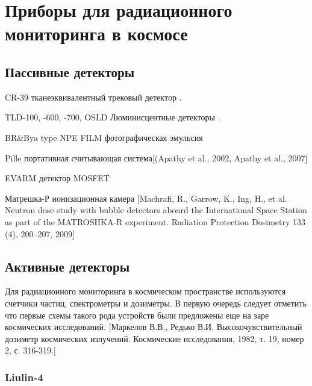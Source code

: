 \section{Приборы для радиационного мониторинга в космосе} \label{sect1_3}



\subsection{Пассивные детекторы} \label{subsect1_3_1}



CR-39 тканеэквивалентный трековый детектор \cite{Zhou2008}.


TLD-100, -600, -700, OSLD Люминисцентные детекторы \cite{Zhou2010}.


BR\&Bya type NPE FILM фотографическая эмульсия


Pille портативная считывающая система[(Apathy et al., 2002, Apathy et al., 2007]


EVARM детектор MOSFET 


Матрешка-Р ионизационная камера [Machrafi, R., Garrow, K., Ing, H., et al. Neutron dose study with bubble detectors aboard the International Space Station as part of the MATROSHKA-R experiment. Radiation Protection Dosimetry 133 (4), 200--207, 2009]

\subsection{Активные детекторы} \label{subsect1_3_2}

Для радиационного мониторинга в космическом пространстве используются счетчики частиц, спектрометры и дозиметры. В первую очередь следует отметить что первые схемы такого рода устройств были предложены еще на заре космических исследований. [Маркелов В.В., Редько В.И. Высокочувствительный дозиметр космических излучений. Космические исследования, 1982, т. 19, номер 2, с. 316-319.]

\subsubsection{Liulin-4}

